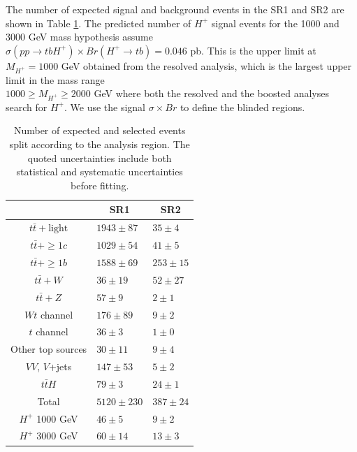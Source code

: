 The number of expected signal and background events in the SR1 and SR2 are shown in Table \ref{tab:PrefitYields}. The predicted number of $H^{+}$ signal events for the 1000 and 3000 GeV mass hypothesis assume\\ ${\sigma}(pp{\rightarrow}tbH^{+}){\times}Br(H^{+}{\rightarrow}tb)=0.046$ pb. This is the upper limit at $M_{H^{+}}=1000$ GeV obtained from the resolved analysis, which is the largest upper limit in the mass range\\ $1000{\geq}M_{H^{+}}{\geq}2000$ GeV where both the resolved and the boosted analyses search for $H^{+}$. We use the signal ${\sigma}{\times}Br$ to define the blinded regions.

\begin{table}[H]
  \centering
  \begin{tabular*}{120mm}{@{\extracolsep{\fill}}cll}
    \hline\hline
                            & \multicolumn{1}{c}{SR1} & \multicolumn{1}{c}{SR2}\\
    \hline
    $t\bar{t}+\text{light}$ & $1943\pm 87$           & $   35\pm  4$ \\
    $t\bar{t}+\geq1c$       & $1029\pm 54$           & $   41\pm  5$ \\
    $t\bar{t}+\geq1b$       & $1588\pm 69$           & $  253\pm 15$ \\
    $t\bar{t}+W$            & $  36\pm 19$           & $   52\pm 27$ \\
    $t\bar{t}+Z$            & $  57\pm  9$           & $    2\pm  1$ \\
    $Wt$ channel            & $ 176\pm 89$           & $    9\pm  2$ \\
    $t$ channel             & $  36\pm  3$           & $    1\pm  0$ \\
    Other top sources       & $  30\pm 11$           & $    9\pm  4$ \\
    $VV$, $V$+jets          & $ 147\pm 53$           & $    5\pm  2$ \\
    $t\bar{t}H$             & $  79\pm  3$           & $   24\pm  1$ \\
    \hline
    Total                   & $5120\pm230$           & $  387\pm 24$ \\
    \hline
    $H^{+}$ 1000 GeV        & $  46\pm  5$           & $    9\pm  2$ \\
    $H^{+}$ 3000 GeV        & $  60\pm 14$           & $   13\pm  3$ \\
    \hline\hline
  \end{tabular*}
  \caption{Number of expected and selected events split according to the analysis region. The quoted uncertainties include both statistical and systematic uncertainties before fitting.}
  \label{tab:PrefitYields}
\end{table}

